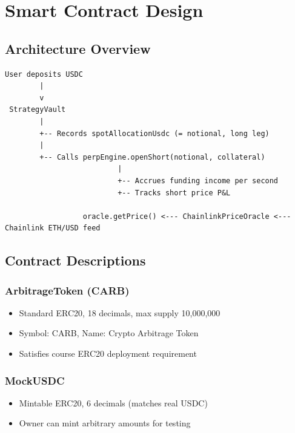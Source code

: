 \documentclass[11pt,a4paper]{article}
\begin{document}
\section{Smart Contract Design}

\subsection{Architecture Overview}

\begin{lstlisting}[caption={High-level contract architecture.}]
User deposits USDC
        |
        v
 StrategyVault
        |
        +-- Records spotAllocationUsdc (= notional, long leg)
        |
        +-- Calls perpEngine.openShort(notional, collateral)
                          |
                          +-- Accrues funding income per second
                          +-- Tracks short price P&L

                  oracle.getPrice() <--- ChainlinkPriceOracle <--- Chainlink ETH/USD feed
\end{lstlisting}

\subsection{Contract Descriptions}

\subsubsection{ArbitrageToken (CARB)}
\begin{itemize}
    \item Standard ERC20, 18 decimals, max supply 10,000,000
    \item Symbol: CARB, Name: Crypto Arbitrage Token
    \item Satisfies course ERC20 deployment requirement
\end{itemize}

\subsubsection{MockUSDC}
\begin{itemize}
    \item Mintable ERC20, 6 decimals (matches real USDC)
    \item Owner can mint arbitrary amounts for testing
\end{itemize}
\end{document}
